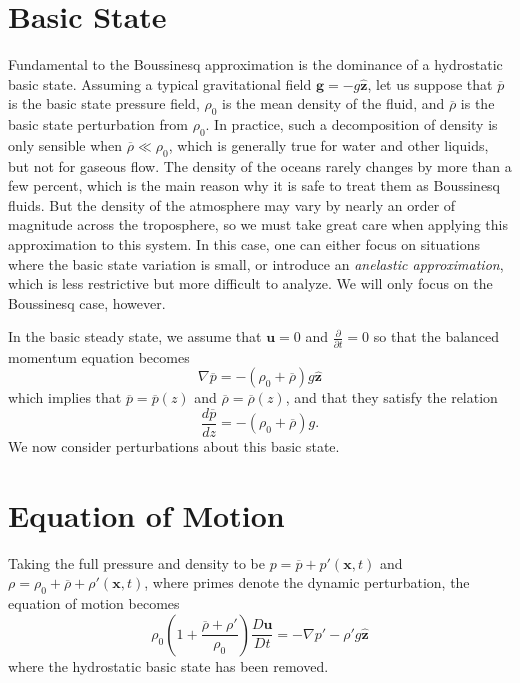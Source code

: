 \documentclass[letterpaper, 11pt]{article}
\newcommand{\pdiff}[2]{\frac{\partial #1}{\partial #2}}
\begin{document}

\section{Basic State}

Fundamental to the Boussinesq approximation is the dominance of a hydrostatic basic state. Assuming a typical gravitational field $\bm{g} = -g \hat{\bm{z}}$, let us suppose that $\overline{p}$ is the basic state pressure field, $\rho_0$ is the mean density of the fluid, and $\overline{\rho}$ is the basic state perturbation from $\rho_0$. In practice, such a decomposition of density is only sensible when $\overline{\rho} \ll \rho_0$, which is generally true for water and other liquids, but not for gaseous flow. The density of the oceans rarely changes by more than a few percent, which is the main reason why it is safe to treat them as Boussinesq fluids. But the density of the atmosphere may vary by nearly an order of magnitude across the troposphere, so we must take great care when applying this approximation to this system. In this case, one can either focus on situations where the basic state variation is small, or introduce an \emph{anelastic approximation}, which is less restrictive but more difficult to analyze. We will only focus on the Boussinesq case, however.

In the basic steady state, we assume that $\bm{u} = 0$ and $\pdiff{}{t} = 0$ so that the balanced momentum equation becomes
\begin{equation*}
\nabla{\overline{p}} = - \left(\rho_0 + \overline{\rho}\right) g \hat{\bm{z}}
\end{equation*}
which implies that $\overline{p} = \overline{p}(z)$ and $\overline{\rho} = \overline{\rho}(z)$, and that they satisfy the relation
\begin{equation}
\frac{d\overline{p}}{dz} = -\left(\rho_0 + \overline{\rho}\right) g.
\end{equation}
We now consider perturbations about this basic state.


\section{Equation of Motion}

Taking the full pressure and density to be $p = \overline{p} + p'(\bm{x},t)$ and $\rho = \rho_0 + \overline{\rho} + \rho'(\bm{x},t)$, where primes denote the dynamic perturbation, the equation of motion becomes
\begin{equation}\label{ExactEqnMotion}
\rho_0 \left(1 + \frac{\overline{\rho} + \rho'}{\rho_0} \right) \frac{D\bm{u}}{Dt} = - \nabla p' - \rho' g \hat{\bm{z}}
\end{equation}
where the hydrostatic basic state has been removed.
\end{document}
